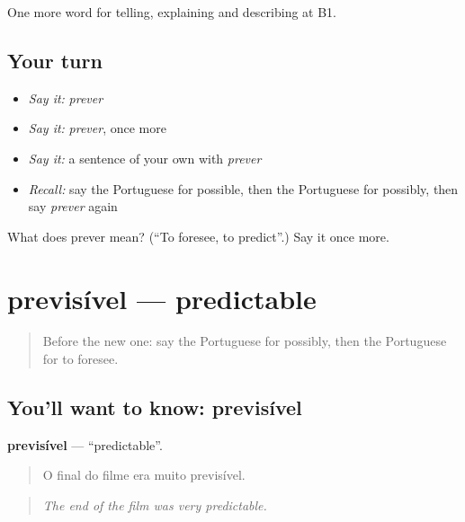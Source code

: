 \begin{grammarlens}[title={What you've built}]
One more word for telling, explaining and describing at B1.
\end{grammarlens}

\subsection*{Your turn}
\begin{itemize}
\raggedright
  \item \emph{Say it:} \emph{prever}
  \item \emph{Say it:} \emph{prever}, once more
  \item \emph{Say it:} a sentence of your own with \emph{prever}
  \item \emph{Recall:} say the Portuguese for possible, then the Portuguese for possibly, then say \emph{prever} again
\end{itemize}

\begin{tcolorbox}[breakable,colback=teal!4,colframe=teal!35!black,title={Before you move on}]
What does prever mean? (\textquotedblleft{}To foresee, to predict\textquotedblright{}.) Say it once more.
\end{tcolorbox}
\section[previsível]{previsível — predictable}

\label{lesson:PT-C371-previsivel}



\begin{quote}
Before the new one: say the Portuguese for possibly, then the Portuguese for to foresee.
\end{quote}

\subsection*{You'll want to know: previsível}
\textbf{previsível} — \textquotedblleft{}predictable\textquotedblright{}.

\begin{quote}
O final do filme era muito previsível.
\end{quote}

\begin{quote}
\emph{The end of the film was very predictable.}
\end{quote}

